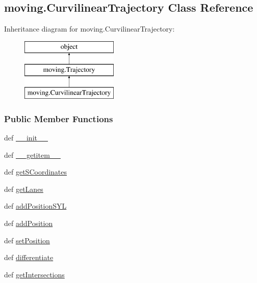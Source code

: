 \hypertarget{classmoving_1_1CurvilinearTrajectory}{\subsection{moving.\-Curvilinear\-Trajectory Class Reference}
\label{classmoving_1_1CurvilinearTrajectory}
}
Inheritance diagram for moving.\-Curvilinear\-Trajectory\-:\begin{figure}[H]
\begin{center}
\leavevmode
\includegraphics[height=3.000000cm]{classmoving_1_1CurvilinearTrajectory}
\end{center}
\end{figure}
\subsubsection*{Public Member Functions}
\begin{DoxyCompactItemize}
\item 
def \hyperlink{classmoving_1_1CurvilinearTrajectory_a9dbb459599ba451e5db49ba8692ef16e}{\-\_\-\-\_\-init\-\_\-\-\_\-}
\item 
def \hyperlink{classmoving_1_1CurvilinearTrajectory_afba688382acd78d1dbd754aa2359d7b2}{\-\_\-\-\_\-getitem\-\_\-\-\_\-}
\item 
def \hyperlink{classmoving_1_1CurvilinearTrajectory_a98a28cc819b039770d91d6cd85b07a9a}{get\-S\-Coordinates}
\item 
def \hyperlink{classmoving_1_1CurvilinearTrajectory_ae888b40fdc00f4709a941ba2f8347006}{get\-Lanes}
\item 
def \hyperlink{classmoving_1_1CurvilinearTrajectory_a99dd45bb2fb145ed4d870f526a7dc7fd}{add\-Position\-S\-Y\-L}
\item 
def \hyperlink{classmoving_1_1CurvilinearTrajectory_aac2115b52dc70976f439e6b218e1c2af}{add\-Position}
\item 
def \hyperlink{classmoving_1_1CurvilinearTrajectory_ad00be5c8422ea1f267f4f7938e306684}{set\-Position}
\item 
def \hyperlink{classmoving_1_1CurvilinearTrajectory_a09580b0a0713cb31cd3c5e82d7161a72}{differentiate}
\item 
def \hyperlink{classmoving_1_1CurvilinearTrajectory_a8dca85f2dd0c7d1ed7b40a2016b699c3}{get\-Intersections}
\end{DoxyCompactItemize}

